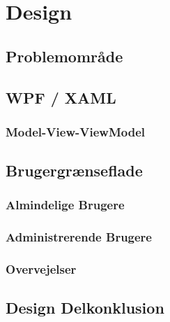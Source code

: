 \chapter{Design}

\section{Problemområde}

\section{WPF / XAML}
\subsection{Model-View-ViewModel}

\section{Brugergrænseflade}
\subsection{Almindelige Brugere}
\subsection{Administrerende Brugere}
\subsection{Overvejelser}

\section{Design Delkonklusion}



